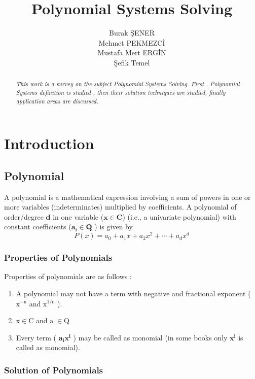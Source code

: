 \documentclass[11pt]{article}
\title{\textbf{Polynomial Systems Solving}}
\author{Burak ŞENER\\
        Mehmet PEKMEZCİ\\
		Mustafa Mert ERGİN\\
		Şefik Temel
		}
\date{}
\begin{document}
\maketitle
\begin{abstract}
\emph{This work is a survey on the subject Polynomial Systems Solving. First , Polynomial Systems definition is studied , then their solution techniques are studied, finally application areas are discussed. }
\end{abstract}

\section{Introduction}

\subsection{Polynomial}
 A polynomial is a mathematical expression involving a sum of powers in one or more variables (indeterminates) multiplied by coefficients. A polynomial of order/degree $\mathbf{d}$  in one variable ($\mathbf{x \in C}$) (i.e., a univariate polynomial) with constant coefficients ($\mathbf{a_i \in Q}$ ) is given by \cite{wolframPolynomial}
\begin{equation}
    P(x)=a_{0}+a_{1}x+a_{2}{x}^2+\cdots+a_{d}{x}^d
\end{equation}

\subsubsection{Properties of Polynomials}

Properties of polynomials are as follows :
\begin{enumerate}
\item A polynomial may not have a term with negative and fractional exponent ($\mathrm{x^{-n}}$ and $\mathrm{x^{1/n}}$ ).
\item $\mathrm{x \in C}$ and $\mathrm{a_i \in Q}$
\item Every term ( $\mathbf{a_ix^i}$ ) may be called as monomial (in some books only $\mathbf{x^i}$ is called as monomial).
\end{enumerate}

\subsubsection{Solution of Polynomials}
\end{document}
